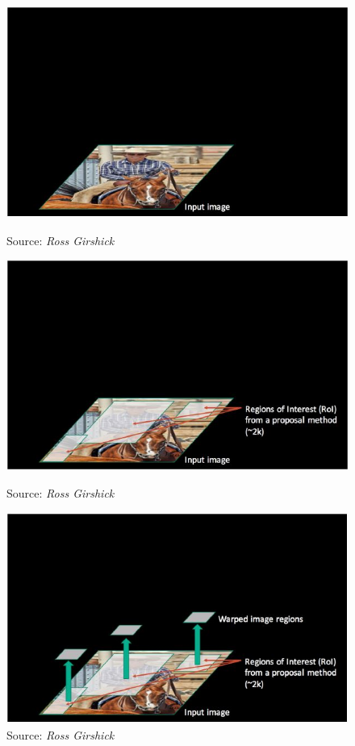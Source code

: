 \begin{frame}
	\vspace{1cm}
	\begin{columns}
		\begin{overlayarea}{\textwidth}{\textheight}
			\begin{figure}
				\begin{overprint}
					\centering\includegraphics[scale= 0.5]{images/33}\caption[Caption]{\hspace{-140pt} Source: \it{Ross Girshick}}
					\centering\includegraphics[scale= 0.5]{images/34}\caption[Caption]{\hspace{-140pt} Source: \it{Ross Girshick}}
					\centering\includegraphics[scale= 0.5]{images/35}\caption[Caption]{\hspace{-140pt} Source: \it{Ross Girshick}}

\end{overprint}
\end{figure}
\end{overlayarea}
\end{columns}
\end{frame}
